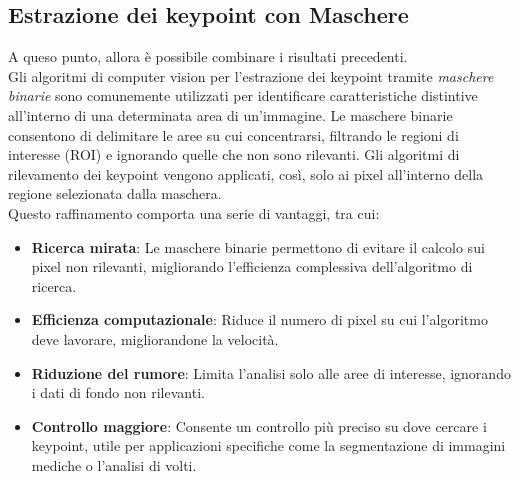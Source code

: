 \documentclass[12pt,a4paper,openright,twoside]{book}
\begin{document}
\subsection{Estrazione dei keypoint con Maschere}
A queso punto, allora è possibile combinare i risultati precedenti.\\
Gli algoritmi di computer vision per l'estrazione dei keypoint tramite {\itshape maschere binarie} sono comunemente utilizzati per identificare caratteristiche distintive all'interno di una determinata area di un'immagine. Le maschere binarie consentono di delimitare le aree su cui concentrarsi, filtrando le regioni di interesse (ROI) e ignorando quelle che non sono rilevanti. Gli algoritmi di rilevamento dei keypoint vengono applicati, così, solo ai pixel all'interno della regione selezionata dalla maschera.\\
Questo raffinamento comporta una serie di vantaggi, tra cui:
\begin{itemize}
\item \textbf{Ricerca mirata}: Le maschere binarie permettono di evitare il calcolo sui pixel non rilevanti, migliorando l’efficienza complessiva dell'algoritmo di ricerca.
\item \textbf{Efficienza computazionale}: Riduce il numero di pixel su cui l'algoritmo deve lavorare, migliorandone la velocità.
\item \textbf{Riduzione del rumore}: Limita l’analisi solo alle aree di interesse, ignorando i dati di fondo non rilevanti.
\item \textbf{Controllo maggiore}: Consente un controllo più preciso su dove cercare i keypoint, utile per applicazioni specifiche come la segmentazione di immagini mediche o l'analisi di volti.
\end{itemize}
\end{document}
